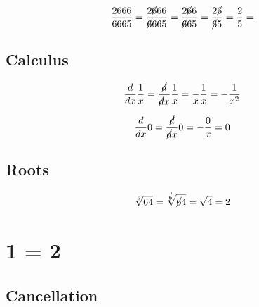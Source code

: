 \documentclass{article}
\begin{document}
\begin{equation}
	\begin{split}
		\frac{2666}{6665}
		=
		\frac{2\cancel{6}66}{\cancel{6}665}
		=
		\frac{2\cancel{6}6}{\cancel{6}65}
		=
		\frac{2\cancel{6}}{\cancel{6}5}
		=
	    \frac{2}{5} =
	\end{split}
\end{equation}



\subsection{Calculus}
\begin{equation}
	\begin{split}
		\frac{d}{dx}
		\frac{1}{x}
		=
		\frac{\cancel{d}}{\cancel{d}x}
		\frac{1}{x}
		=
		\frac{}{x}
		\frac{1}{x}
		=
		- \frac{1}{x^2}
	\end{split}
\end{equation}

\begin{equation}
	\begin{split}
		\frac{d}{dx} 0 =
		\frac{\cancel{d}}{\cancel{d}x} 0
		=
		-\frac{0}{x}
		=
		0
	\end{split}
\end{equation}


\subsection{Roots}

\begin{equation}
	\begin{split}
	     \sqrt[6]{64} = \sqrt[\cancel{6}]{\cancel{6}4} = \sqrt{4} = 2
	\end{split}
\end{equation}

\section{1 = 2}

\subsection{Cancellation}
\end{document}
